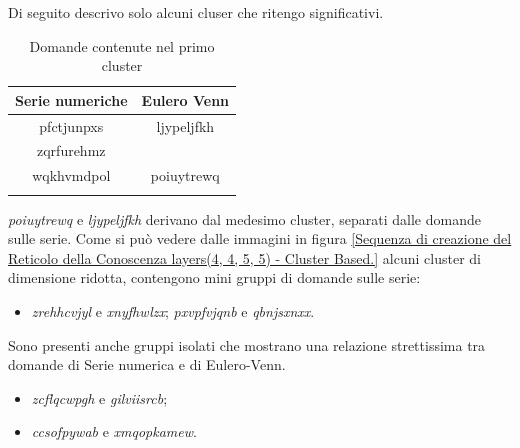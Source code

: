Di seguito descrivo solo alcuni cluser che ritengo significativi.
\begin{longtable}{|c|c|}
	\hline
	\textbf{Serie numeriche} & \textbf{Eulero Venn} \\\hline\hline
	pfctjunpxs & ljypeljfkh \\
	zqrfurehmz & \\
	wqkhvmdpol & poiuytrewq\\ 
\hline
\caption{Domande contenute nel primo cluster}\label{tab:Domande contenute nel primo cluster (rosa)}
\end{longtable}
\noindent
\textit{poiuytrewq} e \textit{ljypeljfkh} derivano dal medesimo cluster, separati dalle domande sulle serie.
\noindent
Come si può vedere dalle immagini in figura \ref{Sequenza di creazione del Reticolo della Conoscenza layers(4, 4, 5, 5) - Cluster Based.} alcuni cluster di dimensione ridotta, contengono mini gruppi di domande sulle serie:\\
\begin{itemize}
\item \textit{zrehhcvjyl} e \textit{xnyfhwlzx};
\textit{pxvpfvjqnb} e \textit{qbnjsxnxx}.
\end{itemize}
\noindent
Sono presenti anche gruppi isolati che mostrano una relazione strettissima tra domande di Serie numerica e di Eulero-Venn.
\begin{itemize}
\item \textit{zcflqcwpgh} e \textit{gilviisrcb};
\item \textit{ccsofpywab} e \textit{xmqopkamew}.
\end{itemize}
\noindent

